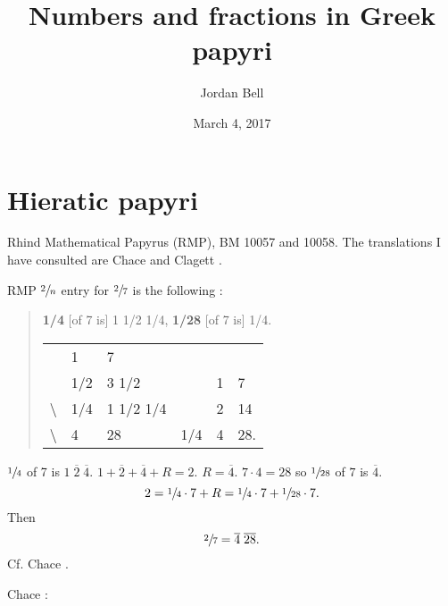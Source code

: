 \documentclass{article}
\begin{document}
\title{Numbers and fractions in Greek papyri}
\author{Jordan Bell}
\date{March 4, 2017}
\maketitle


 
\section{Hieratic papyri}
Rhind Mathematical Papyrus (RMP), BM 10057 and 10058. The translations I have consulted are 
Chace \cite{chace} and Clagett \cite{egyptian3}.

RMP $\sfrac{2}{n}$ entry for 
$\sfrac{2}{7}$ is the following \cite[p.~122]{egyptian3}:

\begin{quote}
\textbf{1/4} [of 7 is] 1 1/2 1/4, \textbf{1/28} [of 7 is] 1/4.

\begin{tabular}{llllll}
&1&7&&&\\
&1/2&3 1/2&&1&7\\
\textbackslash&1/4&1 1/2 1/4&&2&14\\
\textbackslash&4&28&1/4&4&28.
\end{tabular}
\end{quote}

$\sfrac{1}{4}$ of 7  is  $1 \; \overline{2} \; \overline{4}$.
$1 + \overline{2} + \overline{4} + R = 2$. $R=\overline{4}$.
$7\cdot 4 = 28$ so $\sfrac{1}{28}$ of $7$ is $\overline{4}$.
\[
2 = \sfrac{1}{4} \cdot 7 + R = \sfrac{1}{4} \cdot 7 + \sfrac{1}{28} \cdot 7.
\]
Then
\[
\sfrac{2}{7} = \overline{4} \; \overline{28}.
\]
Cf. Chace \cite[pp.~14--15]{chace}.

Chace \cite[pp.~5--6]{chace}:
\end{document}
